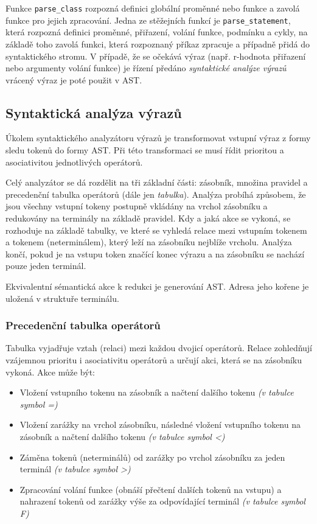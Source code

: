 \documentclass[a4paper,11pt]{article}
\begin{document}
Funkce \texttt{parse\_class} rozpozná definici globální proměnné nebo funkce a zavolá funkce pro jejich zpracování. Jedna ze stěžejních funkcí je \texttt{parse\_statement}, která rozpozná definici proměnné, přiřazení, volání funkce, podmínku a cykly, na základě toho zavolá funkci, která rozpoznaný příkaz zpracuje a případně přidá do syntaktického stromu. V případě, že se očekává výraz (např. r-hodnota přiřazení nebo argumenty volání funkce) je řízení předáno \emph{syntaktické analýze výrazů} vrácený výraz je poté použit v AST.

\subsection{Syntaktická analýza výrazů}
Úkolem syntaktického analyzátoru výrazů je transformovat vstupní výraz z formy sledu tokenů do formy AST. Při této transformaci se musí řídit prioritou a asociativitou jednotlivých operátorů.

Celý analyzátor se dá rozdělit na tři základní části: zásobník, množina pravidel a precedenční tabulka operátorů (dále jen \textit{tabulka}). Analýza probíhá způsobem, že jsou všechny vstupní tokeny postupně vkládány na vrchol zásobníku a redukovány na terminály na základě pravidel. Kdy a jaká akce se vykoná, se rozhoduje na základě tabulky, ve které se vyhledá relace mezi vstupním tokenem a tokenem (neterminálem), který leží na zásobníku nejblíže vrcholu. Analýza končí, pokud je na vstupu token značící konec výrazu a na zásobníku se nachází pouze jeden terminál. 

Ekvivalentní sémantická akce k redukci je generování AST. Adresa jeho kořene je uložená v struktuře terminálu.

\subsubsection{Precedenční tabulka operátorů}
Tabulka vyjadřuje vztah (relaci) mezi každou dvojicí operátorů. Relace zohledňují vzájemnou prioritu i asociativitu operátorů a určují akci, která se na zásobníku vykoná. Akce může být: 
\begin{itemize}
   \item Vložení vstupního tokenu na zásobník a načtení dalšího tokenu \textit{(v tabulce symbol =)}
   \item Vložení zarážky na vrchol zásobníku, následné vložení vstupního tokenu na zásobník a načtení dalšího tokenu \textit{(v tabulce symbol \textless)}
   \item Záměna tokenů (neterminálů) od zarážky po vrchol zásobníku za jeden terminál \textit{(v tabulce symbol \textgreater)}
   \item Zpracování volání funkce (obnáší přečtení dalších tokenů na vstupu) a nahrazení tokenů od zarážky výše za odpovídající terminál \textit{(v tabulce symbol F)}
\end{itemize}
\end{document}
